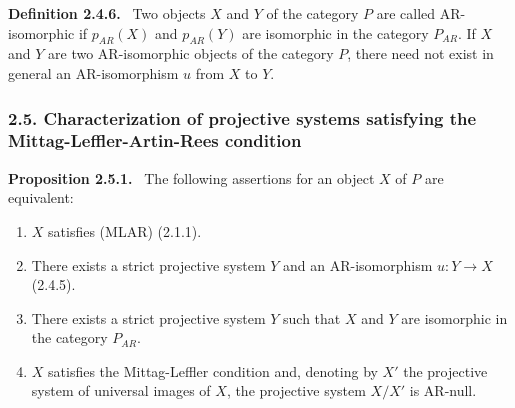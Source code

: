 \documentclass[11pt]{article}
\newenvironment{statement}[1]{\par\medskip\noindent\textbf{#1.}\ }{\par\medskip}
\begin{document}
\begin{statement}{Definition 2.4.6}
Two objects $X$ and $Y$ of the category $P$ are called AR-isomorphic if $p_{AR}(X)$ and $p_{AR}(Y)$ are isomorphic in the category $P_{AR}$. If $X$ and $Y$ are two AR-isomorphic objects of the category $P$, there need not exist in general an AR-isomorphism $u$ from $X$ to $Y$.
\end{statement}

\subsubsection*{2.5. Characterization of projective systems satisfying the Mittag-Leffler-Artin-Rees condition}
\begin{statement}{Proposition 2.5.1}
The following assertions for an object $X$ of $P$ are equivalent:
\begin{enumerate}[label=(\roman*)]
\item $X$ satisfies (MLAR) (2.1.1).
\item There exists a strict projective system $Y$ and an AR-isomorphism $u:Y\to X$ (2.4.5).
\item There exists a strict projective system $Y$ such that $X$ and $Y$ are isomorphic in the category $P_{AR}$.
\item $X$ satisfies the Mittag-Leffler condition and, denoting by $X'$ the projective system of universal images of $X$, the projective system $X/X'$ is AR-null.
\end{enumerate}
\end{statement}
\end{document}

